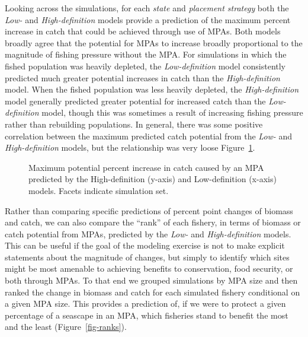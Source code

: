 \documentclass[
  default,
  lineno,
  referee]{sn-jnl}
\begin{document}
Looking across the simulations, for each \emph{state} and
\emph{placement strategy} both the \emph{Low-} and
\emph{High-definition} models provide a prediction of the maximum
percent increase in catch that could be achieved through use of MPAs.
Both models broadly agree that the potential for MPAs to increase
broadly proportional to the magnitude of fishing pressure without the
MPA. For simulations in which the fished population was heavily
depleted, the \emph{Low-definition} model consistently predicted much
greater potential increases in catch than the \emph{High-definition}
model. When the fished population was less heavily depleted, the
\emph{High-definition} model generally predicted greater potential for
increased catch than the \emph{Low-definition} model, though this was
sometimes a result of increasing fishing pressure rather than rebuilding
populations. In general, there was some positive correlation between the
maximum predicted catch potential from the \emph{Low-} and
\emph{High-definition} models, but the relationship was very loose
Figure~\ref{fig-max-catch}.

\begin{figure}


\caption{\label{fig-max-catch}Maximum potential percent increase in
catch caused by an MPA predicted by the High-definition (y-axis) and
Low-definition (x-axis) models. Facets indicate simulation set.}

\end{figure}%

Rather than comparing specific predictions of percent point changes of
biomass and catch, we can also compare the ``rank'' of each fishery, in
terms of biomass or catch potential from MPAs, predicted by the
\emph{Low-} and \emph{High-definition} models. This can be useful if the
goal of the modeling exercise is not to make explicit statements about
the magnitude of changes, but simply to identify which sites might be
most amenable to achieving benefits to conservation, food security, or
both through MPAs. To that end we grouped simulations by MPA size and
then ranked the change in biomass and catch for each simulated fishery
conditional on a given MPA size. This provides a prediction of, if we
were to protect a given percentage of a seascape in an MPA, which
fisheries stand to benefit the most and the least
(Figure~\ref{fig-ranks}).
\end{document}
